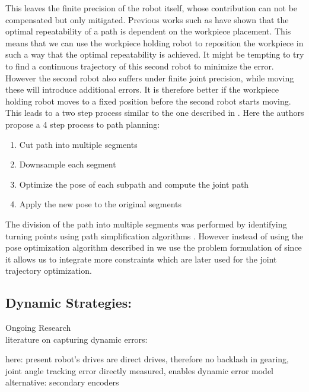 \documentclass[5p,times,procedia]{elsarticle}
\begin{document}
This leaves the finite precision of the robot itself, whose contribution can not be compensated but only mitigated.
Previous works such as \cite{previous_work} have shown that the optimal repeatability of a path is dependent on the workpiece placement.
This means that we can use the workpiece holding robot to reposition the workpiece in such a way that the optimal repeatability is achieved.
It might be tempting to try to find a continuous trajectory of this second robot to minimize the error.
However the second robot also suffers under finite joint precision, while moving these will introduce additional errors.
It is therefore better if the workpiece holding robot moves to a fixed position before the second robot starts moving.
This leads to a two step process similar to the one described in \cite{stroke_division}.
Here the authors propose a 4 step process to path planning:
\begin{enumerate}
	\item Cut path into multiple segments
	\item Downsample each segment
	\item Optimize the pose of each subpath and compute the joint path
	\item Apply the new pose to the original segments
\end{enumerate}
The division of the path into multiple segments was performed by identifying turning points using path simplification algorithms \cite{stroke_division}.
However instead of using the pose optimization algorithm described in \cite{stroke_division} we use the problem formulation of \cite{previous_work} since it allows us to integrate more constraints which are later used for the joint trajectory optimization.






\subsection{Dynamic Strategies:} Ongoing Research \\
literature on capturing dynamic errors:

here: present robot’s drives are direct drives, therefore no backlash in gearing, joint angle tracking error directly measured, 
enables dynamic error model
alternative: secondary encoders~\cite{Mesmer22}
\end{document}

